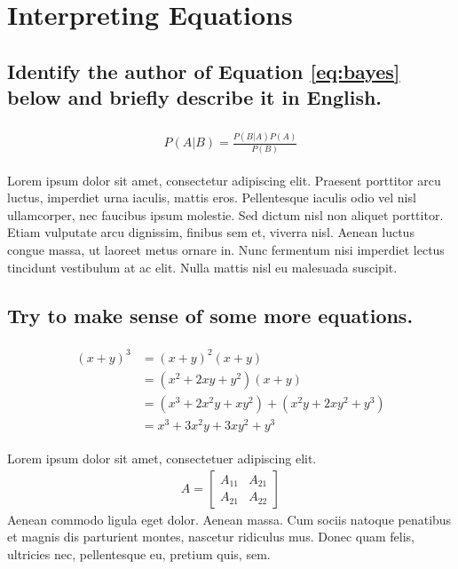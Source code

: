 \documentclass[11pt]{scrartcl} %
\begin{document}
\section{Interpreting Equations}

\subsection{Identify the author of Equation \ref{eq:bayes} below and briefly describe it in English.}

\begin{align} 
	\label{eq:bayes}
	\begin{split}
		P(A|B) = \frac{P(B|A)P(A)}{P(B)}
	\end{split}					
\end{align}

Lorem ipsum dolor sit amet, consectetur adipiscing elit. Praesent porttitor arcu luctus, imperdiet urna iaculis, mattis eros. Pellentesque iaculis odio vel nisl ullamcorper, nec faucibus ipsum molestie. Sed dictum nisl non aliquet porttitor. Etiam vulputate arcu dignissim, finibus sem et, viverra nisl. Aenean luctus congue massa, ut laoreet metus ornare in. Nunc fermentum nisi imperdiet lectus tincidunt vestibulum at ac elit. Nulla mattis nisl eu malesuada suscipit.


\subsection{Try to make sense of some more equations.}

\begin{align} 
	\begin{split}
		(x+y)^3 &= (x+y)^2(x+y)\\
		&=(x^2+2xy+y^2)(x+y)\\
		&=(x^3+2x^2y+xy^2) + (x^2y+2xy^2+y^3)\\
		&=x^3+3x^2y+3xy^2+y^3
	\end{split}					
\end{align}

Lorem ipsum dolor sit amet, consectetuer adipiscing elit. 
\begin{align}
	A = 
	\begin{bmatrix}
		A_{11} & A_{21} \\
		A_{21} & A_{22}
	\end{bmatrix}
\end{align}
Aenean commodo ligula eget dolor. Aenean massa. Cum sociis natoque penatibus et magnis dis parturient montes, nascetur ridiculus mus. Donec quam felis, ultricies nec, pellentesque eu, pretium quis, sem.
\end{document}
